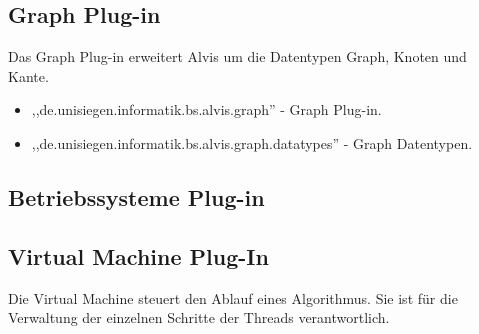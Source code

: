 \documentclass[10pt,a4paper,oneside]{scrbook}
\begin{document}
\subsection{Graph Plug-in}
Das Graph Plug-in erweitert Alvis um die Datentypen Graph, Knoten und Kante.
\begin{itemize}
\item ,,de.unisiegen.informatik.bs.alvis.graph'' - Graph Plug-in.
\item ,,de.unisiegen.informatik.bs.alvis.graph.datatypes'' - Graph Datentypen.
\end{itemize}
\subsection{Betriebssysteme Plug-in}







\subsection{Virtual Machine Plug-In}
Die Virtual Machine steuert den Ablauf eines Algorithmus. Sie ist für die Verwaltung der einzelnen
Schritte der Threads verantwortlich.
\end{document}
